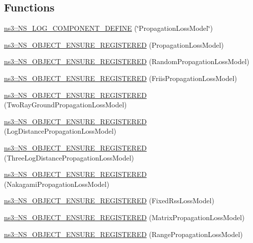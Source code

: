\subsection*{Functions}
\begin{DoxyCompactItemize}
\item 
\hyperlink{namespacens3_a360e5b704dc81138c0dad397c3d44e42}{ns3\+::\+N\+S\+\_\+\+L\+O\+G\+\_\+\+C\+O\+M\+P\+O\+N\+E\+N\+T\+\_\+\+D\+E\+F\+I\+NE} (\char`\"{}Propagation\+Loss\+Model\char`\"{})
\item 
\hyperlink{namespacens3_a7436d886fd69cb1fdf0ac8edf0e9f730}{ns3\+::\+N\+S\+\_\+\+O\+B\+J\+E\+C\+T\+\_\+\+E\+N\+S\+U\+R\+E\+\_\+\+R\+E\+G\+I\+S\+T\+E\+R\+ED} (Propagation\+Loss\+Model)
\item 
\hyperlink{namespacens3_ad9a96da7f880e6991c6bc2939eb4b851}{ns3\+::\+N\+S\+\_\+\+O\+B\+J\+E\+C\+T\+\_\+\+E\+N\+S\+U\+R\+E\+\_\+\+R\+E\+G\+I\+S\+T\+E\+R\+ED} (Random\+Propagation\+Loss\+Model)
\item 
\hyperlink{namespacens3_a0c9622393c7b9c48f7f27f3010b9fa39}{ns3\+::\+N\+S\+\_\+\+O\+B\+J\+E\+C\+T\+\_\+\+E\+N\+S\+U\+R\+E\+\_\+\+R\+E\+G\+I\+S\+T\+E\+R\+ED} (Friis\+Propagation\+Loss\+Model)
\item 
\hyperlink{namespacens3_ac9465b80a8c87d413dd78e4b60213bea}{ns3\+::\+N\+S\+\_\+\+O\+B\+J\+E\+C\+T\+\_\+\+E\+N\+S\+U\+R\+E\+\_\+\+R\+E\+G\+I\+S\+T\+E\+R\+ED} (Two\+Ray\+Ground\+Propagation\+Loss\+Model)
\item 
\hyperlink{namespacens3_a3e296523009469855b1966a4da7d78aa}{ns3\+::\+N\+S\+\_\+\+O\+B\+J\+E\+C\+T\+\_\+\+E\+N\+S\+U\+R\+E\+\_\+\+R\+E\+G\+I\+S\+T\+E\+R\+ED} (Log\+Distance\+Propagation\+Loss\+Model)
\item 
\hyperlink{namespacens3_aeb3873b6ed026a66cd3cb9954795a5d6}{ns3\+::\+N\+S\+\_\+\+O\+B\+J\+E\+C\+T\+\_\+\+E\+N\+S\+U\+R\+E\+\_\+\+R\+E\+G\+I\+S\+T\+E\+R\+ED} (Three\+Log\+Distance\+Propagation\+Loss\+Model)
\item 
\hyperlink{namespacens3_ab0f01d86be3e2b977ee2a925f91cb8a5}{ns3\+::\+N\+S\+\_\+\+O\+B\+J\+E\+C\+T\+\_\+\+E\+N\+S\+U\+R\+E\+\_\+\+R\+E\+G\+I\+S\+T\+E\+R\+ED} (Nakagami\+Propagation\+Loss\+Model)
\item 
\hyperlink{namespacens3_a50d16e60338da64276093a5648b2d2ce}{ns3\+::\+N\+S\+\_\+\+O\+B\+J\+E\+C\+T\+\_\+\+E\+N\+S\+U\+R\+E\+\_\+\+R\+E\+G\+I\+S\+T\+E\+R\+ED} (Fixed\+Rss\+Loss\+Model)
\item 
\hyperlink{namespacens3_a4afbf4982294ece531abda3d6aabfb4f}{ns3\+::\+N\+S\+\_\+\+O\+B\+J\+E\+C\+T\+\_\+\+E\+N\+S\+U\+R\+E\+\_\+\+R\+E\+G\+I\+S\+T\+E\+R\+ED} (Matrix\+Propagation\+Loss\+Model)
\item 
\hyperlink{namespacens3_ad4caac05daf89b8e66466cbd68d69bb6}{ns3\+::\+N\+S\+\_\+\+O\+B\+J\+E\+C\+T\+\_\+\+E\+N\+S\+U\+R\+E\+\_\+\+R\+E\+G\+I\+S\+T\+E\+R\+ED} (Range\+Propagation\+Loss\+Model)
\end{DoxyCompactItemize}
